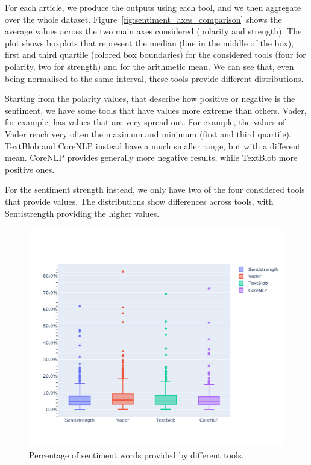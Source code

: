 For each article, we produce the outputs using each tool, and we then aggregate over the whole dataset.
Figure~\ref{fig:sentiment_axes_comparison} shows the average values across the two main axes considered (polarity and strength).
The plot shows boxplots that represent the median (line in the middle of the box), first and third quartile (colored box boundaries) for the considered tools (four for polarity, two for strength) and for the arithmetic mean.
We can see that, even being normalised to the same interval, these tools provide different distributions.

Starting from the polarity values, that describe how positive or negative is the sentiment, we have some tools that have values more extreme than others.
Vader, for example, has values that are very spread out.
For example, the values of Vader reach very often the maximum and minimum (first and third quartile).
TextBlob and CoreNLP instead have a much smaller range, but with a different mean. CoreNLP provides generally more negative results, while TextBlob more positive ones.

For the sentiment strength instead, we only have two of the four considered tools that provide values.
The distributions show differences across tools, with Sentistrength providing the higher values.



\begin{figure}
    \centering
    \includegraphics[trim={0 1.5cm 0 2cm},clip,width=\textwidth]{figures/sentiment_words_comparison.pdf}
    \caption{Percentage of sentiment words provided by different tools.}
    \label{fig:sentiment_words_comparison}
\end{figure}

